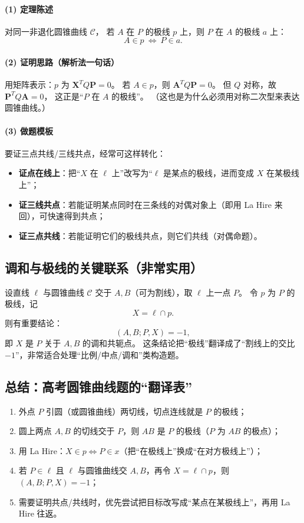 \documentclass[UTF8]{ctexart}
\begin{document}
	\paragraph{(1) 定理陈述}
	对同一非退化圆锥曲线 $\mathcal C$，
	若 $A$ 在 $P$ 的极线 $p$ 上，则 $P$ 在 $A$ 的极线 $a$ 上：
	\[
	A\in p \ \Longleftrightarrow\ P\in a.
	\]
	
	\paragraph{(2) 证明思路（解析法一句话）}
	用矩阵表示：$p$ 为 $\mathbf{X}^TQ\mathbf{P}=0$。
	若 $A\in p$，则 $\mathbf{A}^TQ\mathbf{P}=0$。
	但 $Q$ 对称，故 $\mathbf{P}^TQ\mathbf{A}=0$，
	这正是“$P$ 在 $A$ 的极线”。
	（这也是为什么必须用对称二次型来表达圆锥曲线。）
	
	\paragraph{(3) 做题模板}
	要证三点共线/三线共点，经常可这样转化：
	\begin{itemize}
		\item \textbf{证点在线上}：把“$X$ 在 $\ell$ 上”改写为“$\ell$ 是某点的极线，进而变成 $X$ 在某极线上”；
		\item \textbf{证三线共点}：若能证明某点同时在三条线的对偶对象上（即用 La Hire 来回），可快速得到共点；
		\item \textbf{证三点共线}：若能证明它们的极线共点，则它们共线（对偶命题）。
	\end{itemize}
	
	\subsection{调和与极线的关键联系（非常实用）}
	设直线 $\ell$ 与圆锥曲线 $\mathcal C$ 交于 $A,B$（可为割线），取 $\ell$ 上一点 $P$。
	令 $p$ 为 $P$ 的极线，记
	\[
	X=\ell\cap p.
	\]
	则有重要结论：
	\[
	(A,B;P,X)=-1,
	\]
	即 $X$ 是 $P$ 关于 $A,B$ 的调和共轭点。
	这条结论把“极线”翻译成了“割线上的交比 $-1$”，非常适合处理“比例/中点/调和”类构造题。
	
	\subsection{总结：高考圆锥曲线题的“翻译表”}
	\begin{enumerate}
		\item 外点 $P$ 引圆（或圆锥曲线）两切线，切点连线就是 $P$ 的极线；
		\item 圆上两点 $A,B$ 的切线交于 $P$，则 $AB$ 是 $P$ 的极线（$P$ 为 $AB$ 的极点）；
		\item 用 La Hire：\quad $X\in p \Longleftrightarrow P\in x$（把“在极线上”换成“在对方极线上”）；
		\item 若 $P\in \ell$ 且 $\ell$ 与圆锥曲线交 $A,B$，再令 $X=\ell\cap p$，则 $(A,B;P,X)=-1$；
		\item 需要证明共点/共线时，优先尝试把目标改写成“某点在某极线上”，再用 La Hire 往返。
	\end{enumerate}
	
\end{document}
